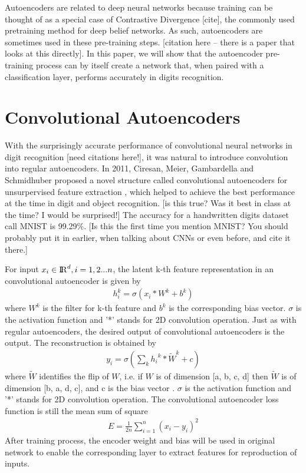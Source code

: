 Autoencoders are related to deep neural networks because training can be thought of as a special case of Contrastive Divergence [cite], the commonly used pretraining method for deep belief networks. As such, autoencoders are sometimes used in these pre-training steps. [citation here -- there is a paper that looks at this directly]. In this paper, we will show that the autoencoder pre-training process can by itself create a network that, when paired with a classification layer, performs accurately in digits recognition. 


\section{Convolutional Autoencoders}

With the surprisingly accurate performance of convolutional neural networks in digit recognition [need citations here!], it was natural to introduce convolution into regular autoencoders. In 2011, Ciresan, Meier, Gambardella and Schmidhuber proposed a novel structure called convolutional autoencoders for unsurpervised feature extraction \cite{masci_stacked_2011}, which helped to achieve the best performance at the time in digit and object recognition. [is this true? Was it best in class at the time? I would be surprised!] The accuracy for a handwritten digits dataset call MNIST \cite{noauthor_mnist_nodate} is 99.29\%. [Is this the first time you mention MNIST? You should probably put it in earlier, when talking about CNNs or even before, and cite it there.] 

For input \(x_{i} \in {\rm I\!R}^d, i = 1, 2...n\), the latent k-th feature representation in an convolutional autoencoder is given by 
\begin{align}
h_{i}^k = \sigma(x_{i}*W^k+b^k)
\end{align}
where \(W^k\) is the filter for k-th feature and \(b^k\) is the corresponding bias vector. \(\sigma\) is the activation function and '*' stands for 2D convolution operation. Just as with regular autoencoders, the desired output of convolutional autoencoders is the output. The reconstruction is obtained by 
\begin{align}
y_i = \sigma(\sum_{k}{h_i}^k*\widetilde{W}^k + c)
\end{align}
where \(\widetilde{W}\) identifies the flip of \(W\), i.e. if \(W\) is of dimension [a, b, c, d] then \(\widetilde{W}\) is of dimension [b, a, d, c], and c is the bias vector \cite{masci_stacked_2011}. \(\sigma\) is the activation function and '*' stands for 2D convolution operation. The convolutional autoencoder loss function is still the mean sum of square
\begin{align}
E = \frac{1}{2n}\sum_{i = 1}^{n}(x_{i} - y_{i})^2
\end{align}
After training process, the encoder weight and bias will be used in original network to enable the corresponding layer to extract features for reproduction of inputs.

